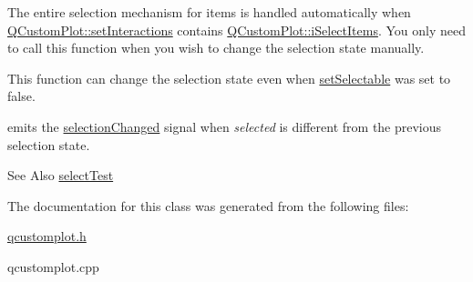 The entire selection mechanism for items is handled automatically when \hyperlink{classQCustomPlot_add9cc886ff5257f64fb4117cf6c135fe}{Q\-Custom\-Plot\-::set\-Interactions} contains \hyperlink{classQCustomPlot_acc82d021129b61e550e36747d2e76d3aa2f1c34708a97bc30cc14684fa6cb844d}{Q\-Custom\-Plot\-::i\-Select\-Items}. You only need to call this function when you wish to change the selection state manually.

This function can change the selection state even when \hyperlink{classQCPAbstractItem_a8a8e32a55bc478b849756a78c2d87fd2}{set\-Selectable} was set to false.

emits the \hyperlink{classQCPAbstractItem_aa5cffb034fc65dbb91c77e02c1c14251}{selection\-Changed} signal when {\itshape selected} is different from the previous selection state.

\begin{DoxySeeAlso}{See Also}
\hyperlink{classQCPAbstractItem_a2e19e88f67f4ba9c13b7e33bd447c075}{select\-Test} 
\end{DoxySeeAlso}


The documentation for this class was generated from the following files\-:\begin{DoxyCompactItemize}
\item 
\hyperlink{qcustomplot_8h}{qcustomplot.\-h}\item 
qcustomplot.\-cpp\end{DoxyCompactItemize}
